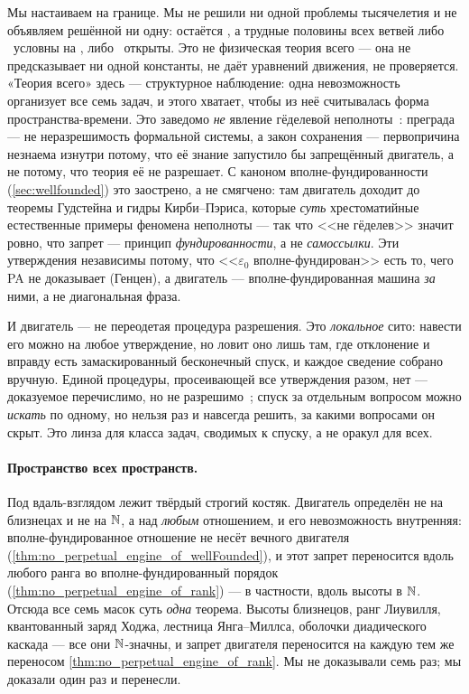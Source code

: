 Мы настаиваем на границе. Мы не решили ни одной проблемы тысячелетия и не объявляем решённой ни одну:
 остаётся , а трудные половины всех ветвей либо
\yellow{}~условны на \axiom{}, либо \red{}~открыты. Это не физическая теория всего — она не
предсказывает ни одной константы, не даёт уравнений движения, не проверяется. «Теория всего» здесь —
структурное наблюдение: одна невозможность организует все семь задач, и этого хватает, чтобы из неё
считывалась форма пространства-времени. Это заведомо \emph{не} явление гёделевой неполноты~\cite{godel1931}:
преграда — не неразрешимость формальной системы, а закон сохранения — первопричина незнаема изнутри
потому, что её знание запустило бы запрещённый двигатель, а не потому, что теория её не разрешает.
С каноном вполне-фундированности (\cref{sec:wellfounded}) это заострено, а не смягчено: там двигатель
доходит до теоремы Гудстейна и гидры Кирби--Пэриса, которые \emph{суть} хрестоматийные естественные
примеры феномена неполноты --- так что <<не гёделев>> значит ровно, что запрет --- принцип
\emph{фундированности}, а не \emph{самоссылки}. Эти утверждения независимы потому, что
<<$\varepsilon_0$ вполне-фундирован>> есть то, чего PA не доказывает (Генцен), а двигатель ---
вполне-фундированная машина \emph{за} ними, а не диагональная фраза.

И двигатель --- не переодетая процедура разрешения. Это \emph{локальное} сито: навести его можно на
любое утверждение, но ловит оно лишь там, где отклонение и вправду есть замаскированный бесконечный
спуск, и каждое сведение собрано вручную. Единой процедуры, просеивающей все утверждения разом, нет
--- доказуемое перечислимо, но не разрешимо~\cite{church1936,turing1936}; спуск за отдельным вопросом
можно \emph{искать} по одному, но нельзя раз и навсегда решить, за какими вопросами он скрыт. Это
линза для класса задач, сводимых к спуску, а не оракул для всех.

\paragraph{Пространство всех пространств.}
Под вдаль-взглядом лежит твёрдый строгий костяк. Двигатель определён не на близнецах и не на
$\mathbb{N}$, а над \emph{любым} отношением, и его невозможность внутренняя: вполне-фундированное отношение
не несёт вечного двигателя (\cref{thm:no_perpetual_engine_of_wellFounded}), и этот запрет переносится
вдоль любого ранга во вполне-фундированный порядок (\cref{thm:no_perpetual_engine_of_rank}) — в
частности, вдоль высоты в $\mathbb{N}$. Отсюда все семь масок суть \emph{одна} теорема. Высоты близнецов, ранг Лиувилля, квантованный заряд
Ходжа, лестница Янга--Миллса, оболочки диадического каскада — все они $\mathbb{N}$-значны, и запрет двигателя
переносится на каждую тем же переносом \cref{thm:no_perpetual_engine_of_rank}. Мы не доказывали семь
раз; мы доказали один раз и перенесли.

